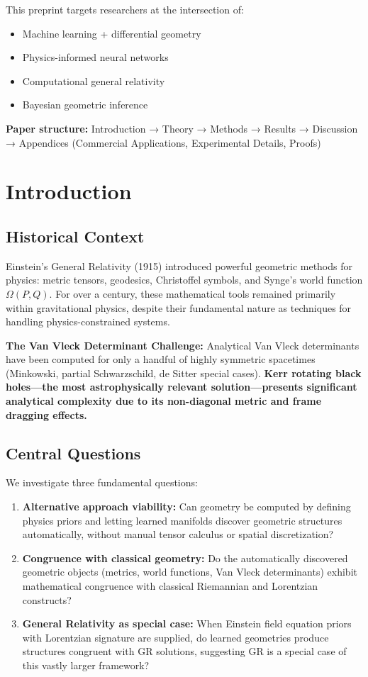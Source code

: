 \documentclass[11pt,a4paper]{article}
\begin{document}
This preprint targets researchers at the intersection of:
\begin{itemize}
\item Machine learning + differential geometry
\item Physics-informed neural networks
\item Computational general relativity
\item Bayesian geometric inference
\end{itemize}

\textbf{Paper structure:} Introduction → Theory → Methods → Results → Discussion → Appendices (Commercial Applications, Experimental Details, Proofs)

\section{Introduction}

\subsection{Historical Context}

Einstein's General Relativity (1915) introduced powerful geometric methods for physics: metric tensors, geodesics, Christoffel symbols, and Synge's world function $\Omega(P,Q)$. For over a century, these mathematical tools remained primarily within gravitational physics, despite their fundamental nature as techniques for handling physics-constrained systems.

\textbf{The Van Vleck Determinant Challenge:} Analytical Van Vleck determinants have been computed for only a handful of highly symmetric spacetimes (Minkowski, partial Schwarzschild, de Sitter special cases). \textbf{Kerr rotating black holes—the most astrophysically relevant solution—presents significant analytical complexity due to its non-diagonal metric and frame dragging effects.}

\subsection{Central Questions}

We investigate three fundamental questions:

\begin{enumerate}
\item \textbf{Alternative approach viability:} Can geometry be computed by defining physics priors and letting learned manifolds discover geometric structures automatically, without manual tensor calculus or spatial discretization?
\item \textbf{Congruence with classical geometry:} Do the automatically discovered geometric objects (metrics, world functions, Van Vleck determinants) exhibit mathematical congruence with classical Riemannian and Lorentzian constructs?
\item \textbf{General Relativity as special case:} When Einstein field equation priors with Lorentzian signature are supplied, do learned geometries produce structures congruent with GR solutions, suggesting GR is a special case of this vastly larger framework?
\end{enumerate}
\end{document}
